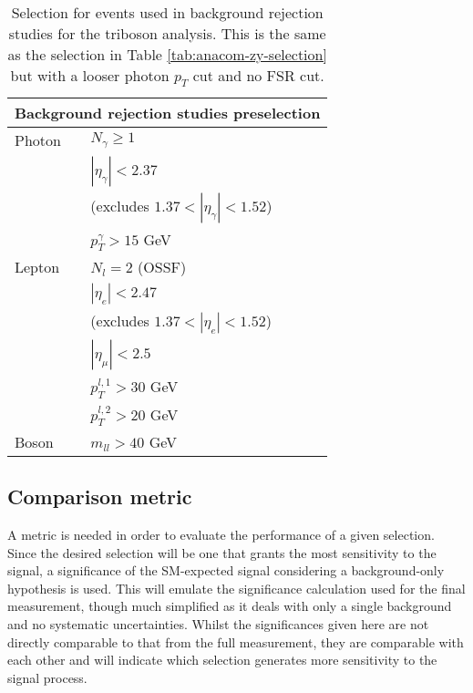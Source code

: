 \begin{table}
  \centering
  \renewcommand\arraystretch{1.3}
  \caption{
    Selection for events used in background rejection studies for the \VZy
    triboson analysis. This is the same as the \Zy selection in Table
    \ref{tab:anacom-zy-selection} but with a looser photon $p_T$ cut and no
    \acs{FSR} cut.
  }
  \begin{tabular}{p{6em}l}
    \hline\hline
    \multicolumn{2}{c}{Background rejection studies preselection} \\
    \hline
    Photon & $N_\gamma \geq 1$ \\
           & $|\eta_\gamma| < 2.37$ \\
           & (excludes $1.37 < |\eta_\gamma| < 1.52$) \\
           & $p_T^\gamma > 15$ GeV \\
    \hline
    Lepton & $N_l = 2$ (OSSF)\\
           & $|\eta_e| < 2.47$ \\
           & (excludes $1.37 < |\eta_e| < 1.52$) \\
           & $|\eta_\mu| < 2.5$ \\
           & $p_T^{l,1} > 30$ GeV \\
           & $p_T^{l,2} > 20$ GeV \\
    \hline
    Boson  & $m_{ll} > 40$ GeV \\
    \hline\hline
  \end{tabular}
  \label{tab:vzy-bdt-preliminaryselection}
\end{table}

\subsection{Comparison metric}
\label{sec:vzy-bdt-significance}

A metric is needed in order to evaluate the performance of a given selection.
Since the desired selection will be one that grants the most sensitivity to the
\VZy signal, a significance of the \ac{SM}-expected signal considering a background-only
hypothesis is used. This will emulate the significance calculation used for the
final measurement, though much simplified as it deals with only a single
background and no systematic uncertainties. Whilst the significances given here
are not directly comparable to that from the full measurement, they are comparable with
each other and will indicate which selection generates more sensitivity to the
signal process.


